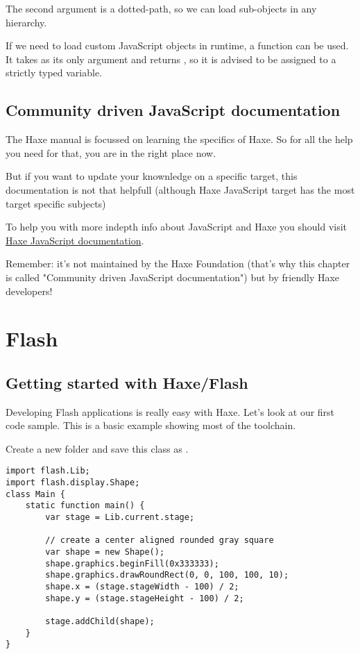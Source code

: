 
The second argument is a dotted-path, so we can load sub-objects in any hierarchy.

If we need to load custom JavaScript objects in runtime, a  function can be used. It takes  as its only argument and returns , so it is advised to be assigned to a strictly typed variable.

\subsection{Community driven JavaScript documentation}
\label{target-javascript-other-documentation}

The Haxe manual is focussed on learning the specifics of Haxe. So for all the help you need for that, you are in the right place now.

But if you want to update your knownledge on a specific target, this documentation is not that helpfull (although Haxe JavaScript target has the most target specific subjects)

To help you with more indepth info about JavaScript and Haxe you should visit \href{https://matthijskamstra.github.io/haxejs/}{Haxe JavaScript documentation}.

Remember: it's not maintained by the Haxe Foundation (that's why this chapter is called "Community driven JavaScript documentation") but by friendly Haxe developers!


\section{Flash}
\label{target-flash}

\subsection{Getting started with Haxe/Flash}
\label{target-flash-getting-started}

Developing Flash applications is really easy with Haxe. Let's look at our first code sample.
This is a basic example showing most of the toolchain.

Create a new folder and save this class as .

\begin{lstlisting}
import flash.Lib;
import flash.display.Shape;
class Main {
    static function main() {
        var stage = Lib.current.stage;

        // create a center aligned rounded gray square
        var shape = new Shape();
        shape.graphics.beginFill(0x333333);
		shape.graphics.drawRoundRect(0, 0, 100, 100, 10);
		shape.x = (stage.stageWidth - 100) / 2;
		shape.y = (stage.stageHeight - 100) / 2;

		stage.addChild(shape);
    }
}
\end{lstlisting}

